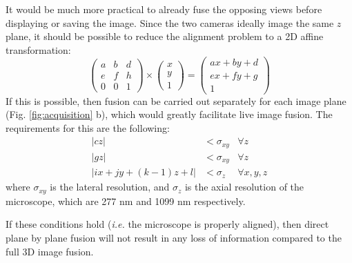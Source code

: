 It would be much more practical to already fuse the opposing views before displaying or saving the image. Since the two cameras ideally image the same $z$ plane, it should be possible to reduce the alignment problem to a 2D affine transformation:
\[
\begin{pmatrix}
a & b & d\\ 
e & f & h \\
0 & 0 & 1
\end{pmatrix}
\times
\begin{pmatrix}
x\\
y\\
1
\end{pmatrix}
=
\begin{pmatrix}
a x + b y + d\\ 
e x + f y + g\\
1
\end{pmatrix}
\]
If this is possible, then fusion can be carried out separately for each image plane (Fig. \ref{fig:acquisition} b), which would greatly facilitate live image fusion. The requirements for this are the following:
\begin{align}
\left| c z \right| &< \sigma_{xy} & \forall z \label{eq:req1}\\
\left| g z \right|  &< \sigma_{xy} & \forall z \label{eq:req2}\\
\left| i x + j y + (k-1)  z + l \right| &< \sigma_z & \forall x, y, z  \label{eq:req3}
\end{align}
where $\sigma_{xy}$ is the lateral resolution, and $\sigma_z$ is the axial resolution of the microscope, which are 277 nm and 1099 nm respectively. 

 If these conditions hold (\textit{i.e.} the microscope is properly aligned), then direct plane by plane fusion will not result in any loss of information compared to the full 3D image fusion.



